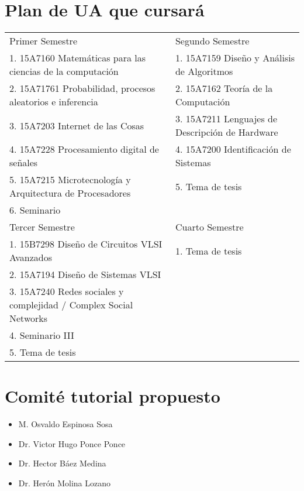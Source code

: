 \documentclass[runningheads,a4paper]{llncs}
\begin{document}
\section{Plan de UA que cursará}
\begin{table}
\begin{center}
 \begin{tabular}{|l|l|}
Primer Semestre & Segundo Semestre\\
1. 15A7160 Matemáticas para las ciencias de la computación & 1. 15A7159 Diseño y Análisis de Algoritmos \\
2. 15A71761 Probabilidad, procesos aleatorios e inferencia & 2. 15A7162 Teoría de la Computación \\
3. 15A7203 Internet de las Cosas & 3. 15A7211 Lenguajes de Descripción de Hardware \\ 
4. 15A7228 Procesamiento digital de señales & 4. 15A7200 Identificación de Sistemas \\ 
5. 15A7215 Microtecnología y Arquitectura de Procesadores & 5. Tema de tesis\\ 
6. Seminario  \\
\hline\noalign{\smallskip}
Tercer Semestre & Cuarto Semestre\\

1. 15B7298 Diseño de Circuitos VLSI Avanzados & 1. Tema de tesis\\
2. 15A7194 Diseño de Sistemas VLSI & \\
3. 15A7240 Redes sociales y complejidad / Complex Social Networks & \\
4. Seminario III& \\
5. Tema de tesis & \\
\hline
\end{tabular}
\end{center}
\end{table}

\section{Comité tutorial propuesto}
\begin{itemize}
\item M. Osvaldo Espinosa Sosa
\item Dr. Victor Hugo Ponce Ponce
\item Dr. Hector Báez Medina
\item Dr. Herón Molina Lozano
 \end{itemize}
\end{document}
